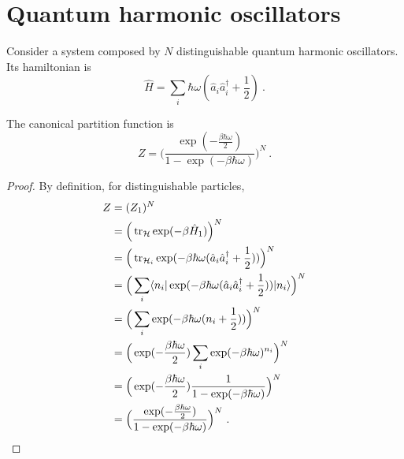 \section{Quantum harmonic oscillators}

    Consider a system composed by $N$ distinguishable quantum harmonic oscillators. Its hamiltonian is 
    \begin{equation*}
        \hat H = \sum_i \hbar \omega (\hat a_i \hat a_i^\dagger + \frac{1}{2}) ~.
    \end{equation*}

    The canonical partition function is 
    \begin{equation*}
        Z = \Big ( \frac{\exp(- \frac{\beta \hbar \omega}{2})}{1 - \exp(- \beta \hbar \omega)} \Big)^N ~.
    \end{equation*}
    \begin{proof}
        By definition, for distinguishable particles,
        \begin{equation*}
        \begin{aligned}
            Z & = (Z_1)^N \\ & = \Big (\operatorname{tr}_{\mathcal H} \exp(- \beta \hat H_1) \Big)^N \\ & = \Big (\operatorname{tr}_{\mathcal H_i} \exp(- \beta \hbar \omega (\hat a_i \hat a_i^\dagger + \frac{1}{2})) \Big)^N \\ & = \Big ( \sum_i \langle n_i\vert\exp(- \beta \hbar \omega (\hat a_i \hat a_i^\dagger + \frac{1}{2})) \vert n_i \rangle\Big)^N \\ & = \Big ( \sum_i \exp(- \beta \hbar \omega (n_i + \frac{1}{2})) \Big)^N \\ & = \Big ( \exp(- \frac{\beta \hbar \omega}{2}) \sum_i \exp(- \beta \hbar \omega)^{n_i} \Big)^N \\ & = \Big ( \exp(- \frac{\beta \hbar \omega}{2}) \frac{1}{1 - \exp(- \beta \hbar \omega)} \Big)^N
            \\ & = \Big ( \frac{\exp(- \frac{\beta \hbar \omega}{2})}{1 - \exp(- \beta \hbar \omega)} \Big)^N ~.
        \end{aligned}
        \end{equation*}
    \end{proof}

